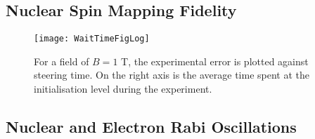 
\subsection{Nuclear Spin Mapping Fidelity}
	\begin{figure}[htbp!]
		\centering
		\texttt{[image: WaitTimeFigLog]}
		\caption{For a field of $B = 1$ T, the experimental error is plotted against steering time. On  the right axis is the average time spent at the initialisation level during the experiment.}
	\end{figure}

\subsection{Nuclear and Electron Rabi Oscillations}


